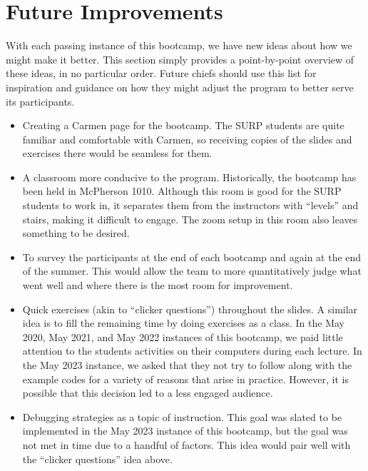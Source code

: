 
\section{Future Improvements}
\label{sec:improvements}
\noindent
With each passing instance of this bootcamp, we have new ideas about how we
might make it better.
This section simply provides a point-by-point overview of these ideas, in
no particular order.
Future chiefs should use this list for inspiration and guidance on how they
might adjust the program to better serve its participants.
\begin{itemize}

	\item Creating a Carmen page for the bootcamp.
	The SURP students are quite familiar and comfortable with Carmen, so
	receiving copies of the slides and exercises there would be seamless for
	them.

	\item A classroom more conducive to the program.
	Historically, the bootcamp has been held in McPherson 1010.
	Although this room is good for the SURP students to work in, it separates
	them from the instructors with ``levels'' and stairs, making it difficult
	to engage.
	The zoom setup in this room also leaves something to be desired.

	\item To survey the participants at the end of each bootcamp and again at
	the end of the summer.
	This would allow the team to more quantitatively judge what went well and
	where there is the most room for improvement.

	\item Quick exercises (akin to ``clicker questions'') throughout the
	slides.
	A similar idea is to fill the remaining time by doing exercises as a class.
	In the May 2020, May 2021, and May 2022 instances of this bootcamp, we paid
	little attention to the students activities on their computers during each
	lecture.
	In the May 2023 instance, we asked that they not try to follow along with
	the example codes for a variety of reasons that arise in practice.
	However, it is possible that this decision led to a less engaged audience.

	\item Debugging strategies as a topic of instruction.
	This goal was slated to be implemented in the May 2023 instance of this
	bootcamp, but the goal was not met in time due to a handful of factors.
	This idea would pair well with the ``clicker questions'' idea above.


\end{itemize}
